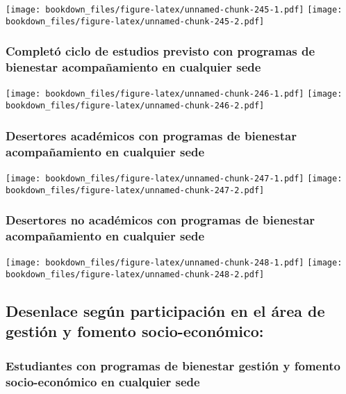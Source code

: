 \documentclass[]{article}
\theoremstyle{definition}
\theoremstyle{definition}
\theoremstyle{definition}
\theoremstyle{remark}
\begin{document}
\texttt{[image: bookdown\_files/figure-latex/unnamed-chunk-245-1.pdf]}
\texttt{[image: bookdown\_files/figure-latex/unnamed-chunk-245-2.pdf]}

\subsubsection{Completó ciclo de estudios previsto con programas de
bienestar acompañamiento en cualquier
sede}\label{completo-ciclo-de-estudios-previsto-con-programas-de-bienestar-acompanamiento-en-cualquier-sede-1}

\texttt{[image: bookdown\_files/figure-latex/unnamed-chunk-246-1.pdf]}
\texttt{[image: bookdown\_files/figure-latex/unnamed-chunk-246-2.pdf]}

\subsubsection{Desertores académicos con programas de bienestar
acompañamiento en cualquier
sede}\label{desertores-academicos-con-programas-de-bienestar-acompanamiento-en-cualquier-sede-1}

\texttt{[image: bookdown\_files/figure-latex/unnamed-chunk-247-1.pdf]}
\texttt{[image: bookdown\_files/figure-latex/unnamed-chunk-247-2.pdf]}

\subsubsection{Desertores no académicos con programas de bienestar
acompañamiento en cualquier
sede}\label{desertores-no-academicos-con-programas-de-bienestar-acompanamiento-en-cualquier-sede-1}

\texttt{[image: bookdown\_files/figure-latex/unnamed-chunk-248-1.pdf]}
\texttt{[image: bookdown\_files/figure-latex/unnamed-chunk-248-2.pdf]}

\subsection{Desenlace según participación en el área de gestión y
fomento
socio-económico:}\label{desenlace-segun-participacion-en-el-area-de-gestion-y-fomento-socio-economico-1}

\subsubsection{Estudiantes con programas de bienestar gestión y fomento
socio-económico en cualquier
sede}\label{estudiantes-con-programas-de-bienestar-gestion-y-fomento-socio-economico-en-cualquier-sede-1}
\end{document}

